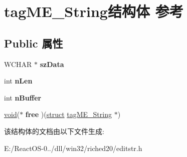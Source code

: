 \hypertarget{structtag_m_e___string}{}\section{tag\+M\+E\+\_\+\+String结构体 参考}
\label{structtag_m_e___string}
\subsection*{Public 属性}
\begin{DoxyCompactItemize}
\item 
\mbox{\label{structtag_m_e___string_a083c4334f4170c65d29446d31c24924b}} 
W\+C\+H\+AR $\ast$ {\bfseries sz\+Data}
\item 
\mbox{\label{structtag_m_e___string_a3a6b8b6c6115252c25da507a4ce35364}} 
int {\bfseries n\+Len}
\item 
\mbox{\label{structtag_m_e___string_a7b5a1cd5d03d168e473cd055d4270a83}} 
int {\bfseries n\+Buffer}
\item 
\mbox{\label{structtag_m_e___string_aa91efa3a1b8c473198acfc4cb4833e3e}} 
\hyperlink{interfacevoid}{void}($\ast$ {\bfseries free} )(\hyperlink{interfacestruct}{struct} \hyperlink{structtag_m_e___string}{tag\+M\+E\+\_\+\+String} $\ast$)
\end{DoxyCompactItemize}


该结构体的文档由以下文件生成\+:\begin{DoxyCompactItemize}
\item 
E\+:/\+React\+O\+S-\/0../dll/win32/riched20/editstr.\+h\end{DoxyCompactItemize}
